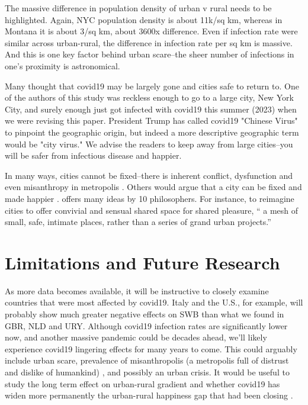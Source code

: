 \documentclass[10pt, letterpaper]{article}
\begin{document}
\begin{spacing}{1.4}
The massive difference in population density of urban v rural needs to be
highlighted. Again, NYC population density is about 11k/sq km, whereas in
Montana it is about 3/sq km, about 3600x difference. Even if infection rate were
similar across urban-rural, the difference in infection rate per sq km is
massive. And this is one key factor behind urban scare--the sheer number of
infections in one's proximity is astronomical.

Many thought that covid19 may be largely gone and cities safe to return to. One of the authors of this study was reckless enough to go to a large city, New York City, and surely enough just got infected with covid19 this summer (2023) when we were revising this paper.  
President Trump has called covid19 "Chinese Virus" to pinpoint the geographic
origin, but indeed a more descriptive geographic term would be "city virus." We
advise the readers to keep away from large cities--you will be safer from
infectious disease and happier.

In many ways, cities cannot be fixed--there is inherent conflict, dysfunction
and even misanthropy in metropolis \cite{wirth38,fischer72,aok22,thrift05,amin06,aokCityBook15,peck16}. 
Others would argue that a city can be fixed and made happier \citep[for a review
see][]{ballas13}. \citet{olasov22} offers many ideas by 10 philosophers. For
instance, to reimagine cities to offer convivial and sensual shared space for shared pleasure, `` a mesh of small, safe, intimate places, rather than a series of grand urban projects.''


\section{Limitations and Future Research}

As more data becomes available, it will be instructive to closely examine
countries that were most affected by covid19. Italy and the U.S., for example,
will probably show much greater negative effects on SWB than what we found in
GBR, NLD and URY. Although covid19 infection rates are significantly lower now,
and another massive pandemic could be decades ahead, we'll likely experience
covid19 lingering effects for many years to come. This could arguably include
urban scare, prevalence of misanthropolis (a metropolis full of distrust and
dislike of humankind) \citep{aok22}, and possibly an urban crisis. It would be
useful to study the long term effect on urban-rural gradient and whether covid19
has widen more permanently the urban-rural happiness gap that had been closing
\citep{aok-swbGenYcity18}.



\end{spacing}
\end{document}
